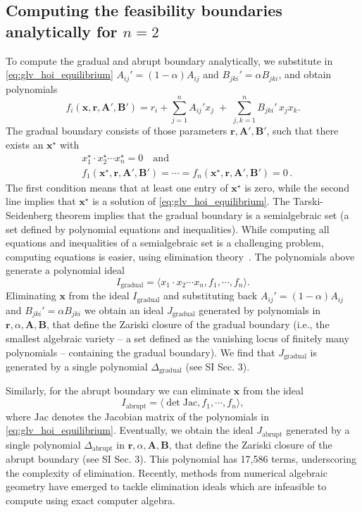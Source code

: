 \documentclass[
 reprint,
 amsmath,
 amssymb,
 aps,
 superscriptaddress,
]{revtex4-2}
\begin{document}
\subsection*{Computing the feasibility boundaries analytically for $n = 2$}
 
To compute the gradual and abrupt boundary analytically, we substitute  in  \eqref{eq:glv_hoi_equilibrium} $ A_{ij}' = (1-\alpha) A_{ij}$ and $B_{jki}'=\alpha B_{jki}$, and  obtain polynomials
$$f_i(\mathbf x, \mathbf r, \mathbf A', \mathbf B') = r_i +\sum_{j=1}^n A_{ij}'x_j
\;+\;\sum_{j,k=1}^n B_{jki}'\,x_j x_k.$$
The gradual boundary consists of those parameters $\mathbf r, \mathbf A', \mathbf B'$, such that there exists an $\mathbf x^\star$ with
\begin{align*}
    &x_1^\star \cdot x_2^\star \cdots x_n^\star =0\quad \text{and} \\
    &f_1(\mathbf x^\star , \mathbf r, \mathbf A', \mathbf B') = \cdots = f_n(\mathbf x^\star , \mathbf r, \mathbf A', \mathbf B') = 0 \, .
\end{align*}
The first condition means that at least one entry of $\mathbf x^\star$ is zero, while the second line implies that $\mathbf x^\star$ is a solution of \eqref{eq:glv_hoi_equilibrium}. The Tarski-Seidenberg theorem \cite[Theorem~4.17]{michalek2021invitation} implies that the gradual boundary is a semialgebraic set (a set defined by polynomial equations and inequalities). While computing all equations and inequalities of a semialgebraic set is a challenging problem, computing equations is easier, using elimination theory~\cite[Chapter 3]{cox_ideals_2018}.
The polynomials above generate a polynomial ideal \cite{cox_ideals_2018}
$$I_\text{gradual} = \langle x_1 \cdot x_2 \cdots x_n, f_1,\cdots,f_n\rangle.$$
Eliminating $\mathbf x$ from the ideal $I_\text{gradual}$ and substituting back $ A_{ij}' = (1-\alpha) A_{ij}$ and $B_{jki}'=\alpha B_{jki}$ we obtain an ideal $J_\text{gradual}$ generated by polynomials in $\mathbf r, \alpha, \mathbf A, \mathbf B$, that define the Zariski closure of the gradual boundary (i.e., the smallest algebraic variety -- a set defined as the vanishing locus of finitely many polynomials -- containing the gradual boundary).
We find that $J_\text{gradual}$ is generated by a single polynomial $\Delta_\text{gradual}$ (see SI Sec. 3).
 
Similarly, for the abrupt boundary we can eliminate $\mathbf x$ from the ideal
$$I_\text{abrupt} = \langle \det \mathrm{Jac}, f_1,\cdots,f_n\rangle,$$
where $\mathrm{Jac}$ denotes the Jacobian matrix of the polynomials in \eqref{eq:glv_hoi_equilibrium}.
Eventually, we obtain the ideal $J_\text{abrupt}$ generated by a single polynomial $\Delta_\text{abrupt}$ in  $\mathbf r, \alpha, \mathbf A, \mathbf B$, that define the Zariski closure of the abrupt boundary (see SI Sec. 3). This polynomial has 17,586 terms, underscoring the complexity of elimination. Recently, methods from numerical algebraic geometry have emerged to tackle elimination ideals \cite{breiding_elimination_2026} which are infeasible to compute using exact computer algebra.
\end{document}
